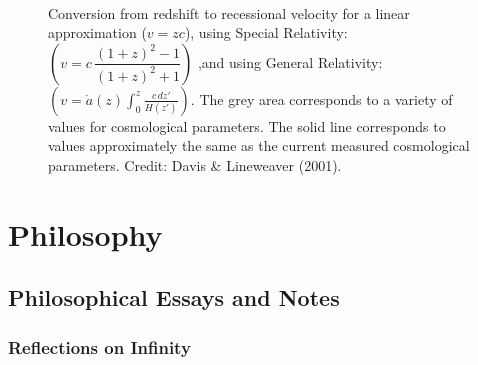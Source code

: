 \documentclass[openany,oneside,12pt,hidelinks]{book}
\begin{document}
\begin{figure}[ht]
  \\
  \caption{%
    Conversion from redshift to recessional velocity for a linear
    approximation (\(v = zc\)), using Special Relativity: \(\left(v = c\,\dfrac{(1+z)^2 - 1}{(1+z)^2 + 1}\right)\)
    ,and using General Relativity:
    \(\left(v = \dot{a}(z)\displaystyle\int_0^z \frac{c\,dz'}{H(z')}\right)\).
    The grey area corresponds to a variety of values for cosmological
    parameters.  The solid line corresponds to values approximately the
    same as the current measured cosmological parameters.
    Credit: Davis \& Lineweaver (2001).
  }
  \label{fig:conversion}
\end{figure}
\part{Philosophy}

\chapter{Philosophical Essays and Notes}

\newpage

\section{Reflections on Infinity}
\end{document}
